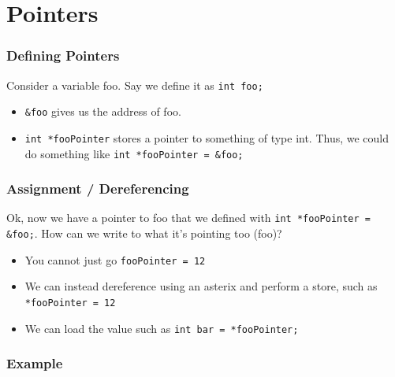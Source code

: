 \documentclass{beamer}
\begin{document}
\section{Pointers}
\begin{frame}
  \frametitle{Defining Pointers}
  Consider a variable foo. Say we define it as \texttt{int foo;}
  \begin{itemize}
    \item \texttt{\&foo} gives us the address of foo.
    \item \texttt{int *fooPointer} stores a pointer to something of type int. Thus, we could do something like \texttt{int *fooPointer = \&foo;}
  \end{itemize}
\end{frame}
\begin{frame}
  \frametitle{Assignment / Dereferencing}
  Ok, now we have a pointer to foo that we defined with \texttt{int *fooPointer = \&foo;}. How can we write to what it's pointing too (foo)?
  \begin{itemize}
    \item You cannot just go \texttt{fooPointer = 12}
    \item We can instead dereference using an asterix and perform a store, such as \texttt{*fooPointer = 12}
    \item We can load the value such as \texttt{int bar = *fooPointer;}
  \end{itemize}
\end{frame}
\begin{frame}
  \frametitle{Example}
  
\end{frame}
\end{document}
